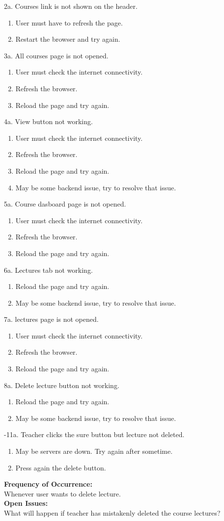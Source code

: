 \documentclass[12pt]{article}
\begin{document}
2a. Courses link is not shown on the header.
\begin{enumerate}
\item User must have to refresh the page.
\item Restart the browser and try again.
\end{enumerate} 
3a. All courses page is not opened.
\begin{enumerate}
\item User must check the internet connectivity.
\item Refresh the browser.
\item Reload the page and try again.
\end{enumerate}
4a. View button not working.
\begin{enumerate}
\item User must check the internet connectivity.
\item Refresh the browser.
\item Reload the page and try again.
\item May be some backend issue, try to resolve that issue.
\end{enumerate}
5a. Course dasboard page is not opened.
\begin{enumerate}
\item User must check the internet connectivity.
\item Refresh the browser.
\item Reload the page and try again.
\end{enumerate}
6a. Lectures tab not working.
\begin{enumerate}
\item Reload the page and try again.
\item May be some backend issue, try to resolve that issue.
\end{enumerate}
7a. lectures page is not opened.
\begin{enumerate}
\item User must check the internet connectivity.
\item Refresh the browser.
\item Reload the page and try again.
\end{enumerate}
8a. Delete lecture button not working.
\begin{enumerate}
\item Reload the page and try again.
\item May be some backend issue, try to resolve that issue.
\end{enumerate}
-11a. Teacher clicks the sure button but lecture not deleted.
\begin{enumerate}
\item May be servers are down. Try again after sometime.
\item Press again the delete button.
\end{enumerate}
\textbf{Frequency of Occurrence:}\\
Whenever user wants to delete lecture.\\
\textbf{Open Issues:}\\
What will happen if teacher has mistakenly deleted the course lectures?
\end{document}
